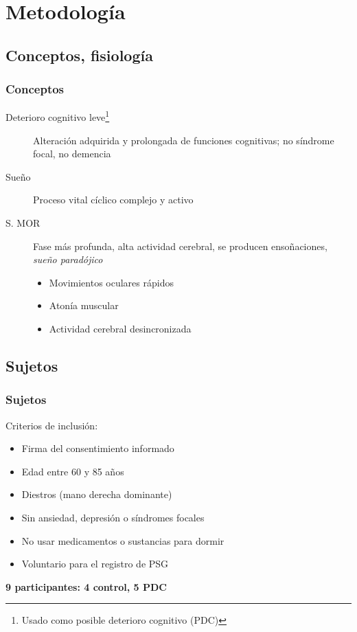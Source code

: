 \documentclass{beamer}
\begin{document}
\section{Metodolog\'ia}

\subsection{Conceptos, fisiolog\'ia}

\begin{frame}

\frametitle{Conceptos}
\begin{description}

\item[Deterioro cognitivo leve\footnote{Usado como posible deterioro cognitivo (PDC)}] 
Alteraci\'on adquirida y prolongada de funciones cognitivas; no s\'indrome focal, no demencia 
\item[Sue\~no] Proceso vital c\'iclico complejo y activo%
\item[S. MOR] Fase m\'as profunda, alta actividad cerebral, se producen enso\~naciones, \textit{sue\~no parad\'ojico}
\begin{itemize}
\item Movimientos oculares r\'apidos
\item Aton\'ia muscular
\item Actividad cerebral desincronizada

\end{itemize}
\end{description}
\end{frame}

\subsection{Sujetos}

\begin{frame}\frametitle{Sujetos}
Criterios de inclusi\'on:
\begin{itemize}
\item Firma del consentimiento informado
\item Edad entre 60 y 85 a\~nos
\item Diestros (mano derecha dominante)
\item Sin ansiedad, depresi\'on o s\'indromes focales
\item No usar medicamentos o sustancias para dormir
\item Voluntario para el registro de PSG
\end{itemize}

\textbf{9 participantes: 4 control, 5 PDC}
\end{frame}
\end{document}
